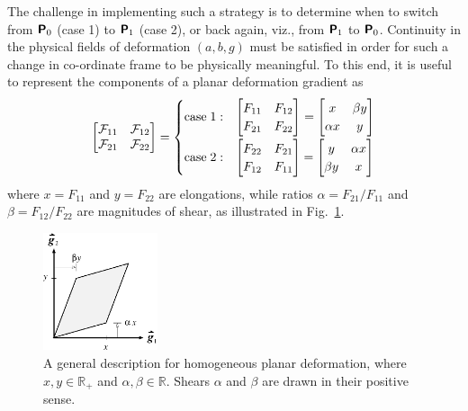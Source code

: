 The challenge in implementing such a strategy is to determine when to switch from $\boldsymbol{\mathsf{P}}_0$ (case 1) to $\boldsymbol{\mathsf{P}}_1$ (case 2), or back again, viz., from $\boldsymbol{\mathsf{P}}_1$ to $\boldsymbol{\mathsf{P}}_0$.  Continuity in the physical fields of deformation $(a , b , g )$ must be satisfied in order for such a change in co-ordinate frame to be physically meaningful.  To this end, it is useful to represent the components of a planar deformation gradient as
\begin{equation}
\begin{bmatrix}
\mathcal{F}_{11} & \mathcal{F}_{12} \\
\mathcal{F}_{21} & \mathcal{F}_{22}
\end{bmatrix} =
\begin{cases}
\mathrm{case} \; 1: & \begin{bmatrix}
F_{11} & F_{12} \\
F_{21} & F_{22}
\end{bmatrix}_{\vphantom{|}} = \begin{bmatrix}
x & \beta y \\ \alpha x & y
\end{bmatrix} \\
\mathrm{case} \; 2: & \begin{bmatrix}
F_{22} & F_{21} \\
F_{12} & F_{11}
\end{bmatrix} = \begin{bmatrix}
y & \alpha x \\ \beta y & x
\end{bmatrix}
\end{cases}
\label{deformationGradientRelabelling}
\end{equation}
where $x = F_{11}$ and $y = F_{22}$ are elongations, while ratios $\alpha = F_{21} / F_{11}$ and $\beta = F_{12} / F_{22}$ are magnitudes of shear, as illustrated in Fig.~\ref{figF}.  

\begin{figure}
	\centering
	\includegraphics[width=0.3\textwidth]{figures/figF.png}
	\caption{A general description for homogeneous planar deformation, where $x , y \in \mathbb{R}_+$ and $\alpha , \beta \in \mathbb{R}$.  Shears $\alpha$ and $\beta$ are drawn in their positive sense.}
	\label{figF}
\end{figure}

